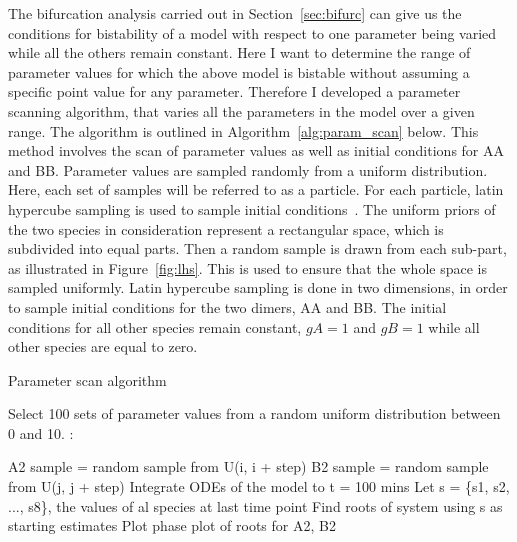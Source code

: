 The bifurcation analysis carried out in Section~\ref{sec:bifurc} can give us the conditions for bistability of a model with respect to one parameter being varied while all the others remain constant. Here I want to determine the range of parameter values for which the above model is bistable without assuming a specific point value for any parameter. Therefore I developed a parameter scanning algorithm, that varies all the parameters in the model over a given range. The algorithm is outlined in Algorithm~\ref{alg:param_scan} below. This method involves the scan of parameter values as well as initial conditions for AA and BB. Parameter values are sampled randomly from a uniform distribution. Here, each set of samples will be referred to as a particle. For each particle, latin hypercube sampling is used to sample initial conditions~\autocite{MCKAY:2000vt}. The uniform priors of the two species in consideration represent a rectangular space, which is subdivided into equal parts. Then a random sample is drawn from each sub-part, as illustrated in Figure~\ref{fig:lhs}. This is used to ensure that the whole space is sampled uniformly. Latin hypercube sampling is done in two dimensions, in order to sample initial conditions for the two dimers, AA and BB. The initial conditions for all other species remain constant, $gA = 1$ and  $gB = 1$ while all other species are equal to zero. 

\begin{algorithm}[htbp]
\caption{Parameter scan algorithm}
\label{alg:param_scan}
 \begin{algorithmic}[1]
    \Statex
	\State Select 100 sets of parameter values from a random uniform distribution between 0 and 10.
	:
		
				\State A2 sample = random sample from U(i, i + step) 
				\State B2 sample = random sample from U(j, j + step) 
			\EndFor
		\EndFor
	\State Integrate ODEs of the model to t = 100 mins
	\State Let s = \{s1, s2, ..., s8\}, the values of al species at last time point
	\State Find roots of system using s as starting estimates 
	\EndFor
	\State Plot phase plot of roots for A2, B2
	\EndFor
  \end{algorithmic} 
\end{algorithm}

